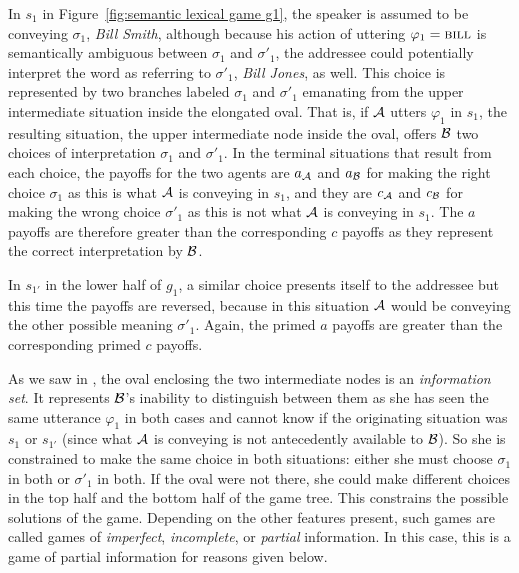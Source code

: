 In $s_1$ in Figure~\ref{fig:semantic lexical game g1}, the speaker is assumed to be conveying $\sigma_1$, \emph{Bill Smith}, although because his action of uttering $\varphi_1 = \Expression{Bill}$ is semantically ambiguous between $\sigma_1$ and $\sigma'_1$, the addressee could potentially interpret the word as referring to $\sigma'_1$, \emph{Bill Jones}, as well. This choice is represented by two branches labeled $\sigma_1$ and $\sigma'_1$ emanating from the upper intermediate situation inside the elongated oval. That is, if $\cal A$ utters $\varphi_1$ in $s_1$, the resulting situation, the upper intermediate node inside the oval, offers $\cal B$ two choices of interpretation $\sigma_1$ and $\sigma'_1$. In the terminal situations that result from each choice, the payoffs for the two agents are $a_{\cal A}$ and $a_{\cal B}$ for making the right choice $\sigma_1$ as this is what $\cal A$ is conveying in $s_1$, and they are $c_{\cal A}$ and $c_{\cal B}$ for making the wrong choice $\sigma'_1$ as this is not what $\cal A$ is conveying in $s_1$. The $a$ payoffs are therefore greater than the corresponding $c$ payoffs as they represent the correct interpretation by $\cal B$. \label{page:payoff comparisons} 


In $s_{1'}$ in the lower half of $g_1$, a similar choice presents itself to the addressee but this time the payoffs are reversed, because in this situation $\cal A$ would be conveying the other possible meaning $\sigma'_1$. Again, the primed $a$ payoffs are greater than the corresponding primed $c$ payoffs.

As we saw in , the oval enclosing the two intermediate nodes is an \emph{information set}. It represents $\cal B$'s inability to distinguish between them as she has seen the same utterance $\varphi_1$ in both cases and cannot know if the originating situation was $s_{1}$ or $s_{1'}$ (since what $\cal A$ is conveying is not antecedently available to $\cal B$). So she is constrained to make the same choice in both situations: either she must choose $\sigma_1$ in both or $\sigma'_1$ in both. If the oval were not there, she could make different choices in the top half and the bottom half of the game tree. This constrains the possible solutions of the game. Depending on the other features present, such games are called games of \emph{imperfect}, \emph{incomplete}, or \emph{partial} information. In this case, this is a game of partial information for reasons given below.

